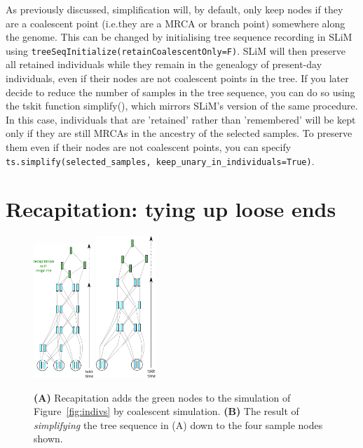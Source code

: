 \documentclass[12pt]{article}
\newcommand*{\ie}{i.e.\xcomma}
\begin{document}
As previously discussed, simplification will, by default, only keep nodes if they are a coalescent point
(\ie they are a MRCA or branch point) somewhere along the genome.
This can be changed by initialising tree sequence recording in SLiM using
\verb|treeSeqInitialize(retainCoalescentOnly=F)|.
SLiM will then preserve all retained individuals while they remain in the genealogy of present-day individuals,
even if their nodes are not coalescent points in the tree.
If you later decide to reduce the number
of samples in the tree sequence, you can do so using the tskit function simplify(),
which mirrors SLiM's version of the same procedure.
In this case, individuals that are 'retained' rather than 'remembered' will be kept only
if they are still MRCAs in the ancestry of the selected samples.
To preserve them even if their nodes are not coalescent points,
you can specify \verb|ts.simplify(selected_samples, keep_unary_in_individuals=True)|.

\section{Recapitation: tying up loose ends} %

\begin{figure}
\centering
    \includegraphics[width=0.2\textwidth]{figures/pedigree_recapitate.pdf}
    \includegraphics[width=0.2\textwidth]{figures/pedigree_simplify.pdf}
\caption{
    \textbf{(A)} Recapitation adds the green nodes 
    to the simulation of Figure~\ref{fig:indivs} by coalescent simulation.
    \textbf{(B)} The result of \emph{simplifying} the tree sequence in (A)
    down to the four sample nodes shown.
}
\label{fig:recap_simp}
\end{figure}
\end{document}
